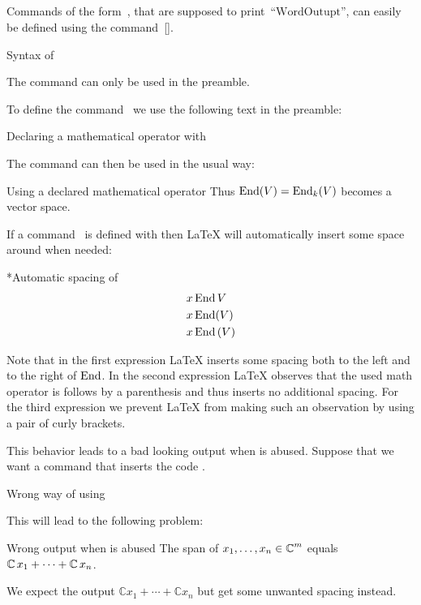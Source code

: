 \subsection{}

Commands of the form~, that are supposed to print~\enquote{$\mathrm{WordOutupt}$}, can easily be defined using the command~[\comname].
\begin{showcode}{Syntax of~}
\DeclareMathOperator{\WordCommand}{WordOutput}
\end{showcode}
The command  can only be used in the preamble.

To define the command~ we use the following text in the preamble:
\begin{showcode}{Declaring a mathematical operator with~}
\DeclareMathOperator{\End}{End}
\end{showcode}
The command  can then be used in the usual way:
\begin{showlatex}{Using a declared mathematical operator}
Thus $\End(V) = \End_k(V)$ becomes a vector space.
\end{showlatex}

If a command~ is defined with  then {\LaTeX} will automatically insert some space around  when needed:
\begin{showlatex}*{Automatic spacing of~}
\begin{align*}
&x \End V
\\
&x \End(V)
\\
&x \End {(V)}
\end{align*}
\end{showlatex}
Note that in the first expression {\LaTeX} inserts some spacing both to the left and to the right of $\End$.
In the second expression {\LaTeX} observes that the used math operator is follows by a parenthesis and thus inserts no additional spacing.
For the third expression we prevent {\LaTeX} from making such an observation by using a pair of curly brackets.

This behavior leads to a bad looking output when  is abused.
Suppose that we want a command  that inserts the code .
\begin{showcode}{Wrong way of using }
\DeclareMathOperator{\Complex}{\mathbb{C}}
\end{showcode}
This will lead to the following problem:
\begin{showlatex}{Wrong output when  is abused}
The span of $x_1, \dotsc, x_n \in \Complex^m$ equals $\Complex x_1 + \dotsb + \Complex x_n$.
\end{showlatex}
We expect the output $\mathbb{C} x_1 + \dotsb + \mathbb{C} x_n$ but get some unwanted spacing instead.



